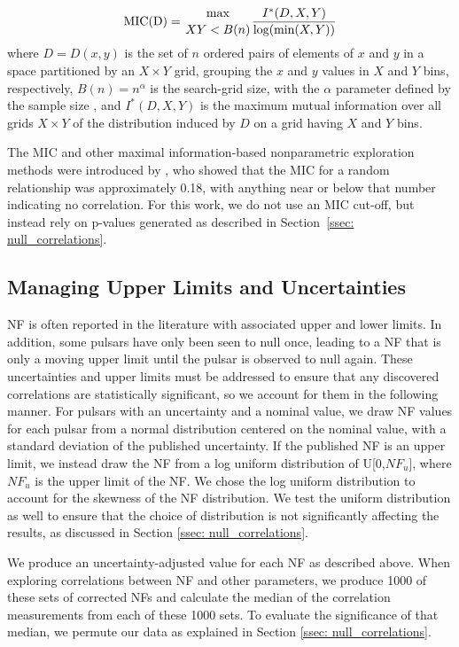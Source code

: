 \documentclass[fleqn,usenatbib]{mnras}
\begin{document}
\begin{equation}
    \textrm{MIC(D)}  = \genfrac{}{}{0pt}{}{\textrm{max}}{XY<B(n)} \frac{I^*(D,X,Y)}{\textrm{log}(\textrm{min}(X,Y))}
\end{equation}
\noindent where $D=D(x,y)$ is the set of $n$ ordered pairs of elements of $x$ and $y$ in a space partitioned by an $X\times Y$ grid, grouping the $x$ and $y$ values in $X$ and $Y$ bins, respectively, $B(n) = n^{\alpha}$ is the search-grid size, with the $\alpha$ parameter defined by the sample size  \citep[here, $\alpha=0.75$ ][]{albanese2018practical}, and $I^*(D,X,Y)$ is the maximum mutual information over all grids $X\times Y$ of the distribution induced by $D$ on a grid having $X$ and $Y$ bins.  

The MIC and other maximal information-based nonparametric exploration methods were introduced by \citet{reshef2011detecting}, who showed that the MIC for a random relationship was approximately 0.18, with anything near or below that number indicating no correlation. For this work, we do not use an MIC cut-off, but instead rely on p-values generated as described in Section~\ref{ssec: null_correlations}.

\subsection{Managing Upper Limits and Uncertainties}
\label{ssec: upperlims_uncertainties}

NF is often reported in the literature with associated upper and lower limits. In addition, some pulsars have only been seen to null once, leading to a NF that is only a moving upper limit until the pulsar is observed to null again. These uncertainties and upper limits must be addressed to ensure that any discovered correlations are statistically significant, so we account for them in the following manner. For pulsars with an uncertainty and a nominal value, we draw NF values for each pulsar from a normal distribution centered on the nominal value, with a standard deviation of the published uncertainty. If the published NF is an upper limit, we instead draw the NF from a log uniform distribution of U[0,$NF_u$], where $NF_u$ is the upper limit of the NF. We chose the log uniform distribution to account for the skewness of the NF distribution. We test the uniform distribution as well to ensure that the choice of distribution is not significantly affecting the results, as discussed in Section \ref{ssec: null_correlations}.

We produce an uncertainty-adjusted value for each NF as described above. When exploring correlations between NF and other parameters, we produce 1000 of these sets of corrected NFs and calculate the median of the correlation measurements from each of these 1000 sets. To evaluate the significance of that median, we permute our data as explained in Section \ref{ssec: null_correlations}.
\end{document}
